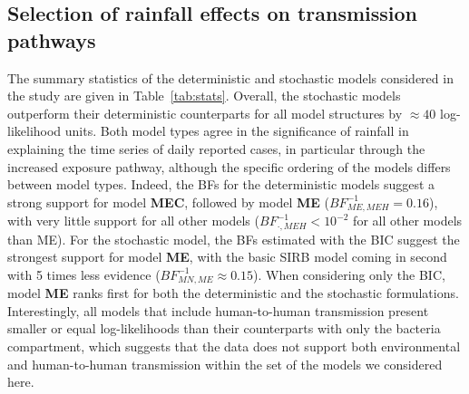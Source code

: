 \subsection{Selection of rainfall effects on transmission pathways}
The summary statistics of the deterministic and stochastic models considered in the study are given in Table~\ref{tab:stats}. Overall, the stochastic models outperform their deterministic counterparts for all model structures by $\approx 40$ log-likelihood units. Both model types agree in the significance of rainfall in explaining the time series of daily reported cases, in particular through the increased exposure pathway, although the specific ordering of the models differs between model types. Indeed, the BFs for the deterministic models suggest a strong support for model \textbf{MEC}, followed by model \textbf{ME} ($BF^{-1}_{ME,MEH} = 0.16$), with very little support for all other models ($BF^{-1}_{\boldsymbol{\cdot},MEH}< 10^{-2}$ for all other models than ME). For the stochastic model, the BFs estimated with the BIC suggest the strongest support for model \textbf{ME}, with the basic SIRB model coming in second with 5 times less evidence ($BF^{-1}_{MN,ME} \approx 0.15$). When considering only the BIC, model \textbf{ME} ranks first for both the deterministic and the stochastic formulations. Interestingly, all models that include human-to-human transmission present smaller or equal log-likelihoods than their counterparts with only the bacteria compartment, which suggests that the data does not support both environmental and human-to-human transmission within the set of the models we considered here.

